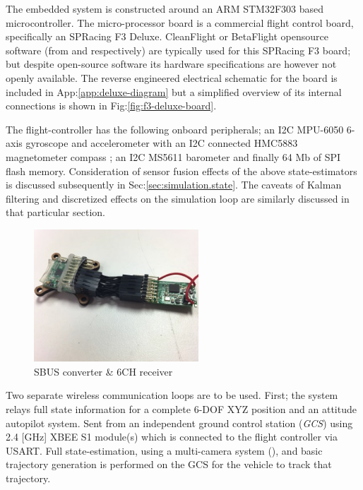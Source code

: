 The embedded system is constructed around an ARM STM32F303\cite{stm32f303} based microcontroller. The micro-processor board is a commercial flight control board, specifically an SPRacing F3 Deluxe\cite{spracing}. CleanFlight or BetaFlight opensource software (from \cite{cleanflight} and \cite{betaflight} respectively) are typically used for this SPRacing F3 board; but despite open-source software its hardware specifications are  however not openly available. The reverse engineered electrical schematic for the board is included in App:\ref{app:deluxe-diagram} but a simplified overview of its internal connections is shown in Fig:\ref{fig:f3-deluxe-board}.
\par
The flight-controller has the following onboard peripherals; an I2C MPU-6050 6-axis gyroscope and accelerometer \cite{mpu6050} with an I2C connected HMC5883 magnetometer compass \cite{hmc5883}; an I2C MS5611 barometer \cite{ms5611} and finally 64 Mb of SPI flash memory. Consideration of sensor fusion effects of the above state-estimators is discussed subsequently in Sec:\ref{sec:simulation.state}. The caveats of Kalman filtering and discretized effects on the simulation loop are similarly discussed in that particular section.
\begin{figure}[hbtp]
\centering
\includegraphics[width=0.55\textwidth]{figs/ppm-sbus}
\caption{SBUS converter \& 6CH receiver}
\label{fig:ppm-sbus}
\vspace{-20pt}
\end{figure}
\par
Two separate wireless communication loops are to be used. First; the system relays full state information for a complete 6-DOF XYZ position and an attitude autopilot system. Sent from an independent ground control station (\emph{GCS}) using 2.4 [GHz] XBEE S1 module(s)\cite{xbees1} which is connected to the flight controller via USART. Full state-estimation, using a multi-camera system (\cite{arnold}), and basic trajectory generation is performed on the GCS for the vehicle to track that trajectory. 
